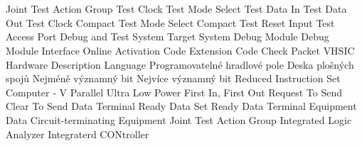 \cleardoublepage
\chapter*{\listofabbrevname}
{}

\begin{acronym}[KolikMista]

		{Joint Test Action Group}
		{Test Clock}
		{Test Mode Select}
		{Test Data In}
		{Test Data Out}
		{Test Clock Compact}
		{Test Mode Select Compact}
		{Test Reset Input}
		{Test Access Port}
		{Debug and Test System}
		{Target System}
		{Debug Module}
		{Debug Module Interface}
		{Online Activation Code}	
		{Extension Code}
		{Check Packet}
		{VHSIC Hardware Description Language}
		{Programovatelné hradlové pole}
		{Deska plošných spojů}
		{Nejméně významný bit}
		{Nejvíce významný bit}
		{Reduced Instruction Set Computer - V}
		{Parallel Ultra Low Power}
		{First In, First Out}
		{Request To Send}
		{Clear To Send}
		{Data Terminal Ready}
		{Data Set Ready}
		{Data Terminal Equipment}
		{Data Circuit-terminating Equipment}
		{Joint Test Action Group}
		{Integrated Logic Analyzer}
		{Integraterd CONtroller}
		
\end{acronym}
